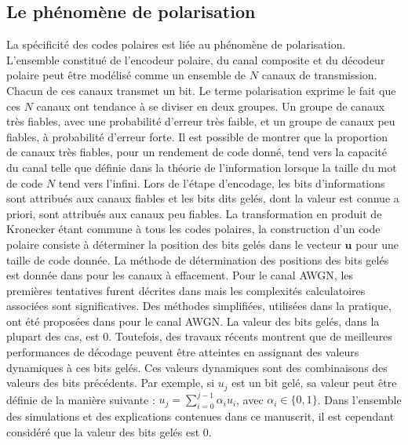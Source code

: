 \subsection{Le phénomène de polarisation}
\label{subsec:polarisation}
La spécificité des codes polaires est liée au phénomène de polarisation. L'ensemble constitué de l'encodeur polaire, du canal composite et du décodeur polaire peut être modélisé comme un ensemble de $N$ canaux de transmission. Chacun de ces canaux transmet un bit. Le terme \og polarisation \fg exprime le fait que ces $N$ canaux ont tendance à se diviser en deux groupes. Un groupe de canaux très fiables, avec une probabilité d'erreur très faible, et un groupe de canaux peu fiables, à probabilité d'erreur forte.
Il est possible de montrer que la proportion de canaux très fiables, pour un rendement de code donné, tend vers la capacité du canal telle que définie dans la théorie de l'information \cite{shannon_mathematical_2001} lorsque la taille du mot de code $N$ tend vers l'infini.
Lors de l'étape d'encodage, les bits d'informations sont attribués aux canaux fiables et les bits dits gelés, dont la valeur est connue a priori, sont attribués aux canaux peu fiables. La transformation en produit de Kronecker étant commune à tous les codes polaires, la construction d'un code polaire consiste à déterminer la position des bits gelés dans le vecteur $\mathbold{u}$ pour une taille de code donnée. La méthode de détermination des positions des bits gelés est donnée dans \cite{arikan_channel_2009} pour les canaux à effacement. Pour le canal AWGN, les premières tentatives furent décrites dans \cite{mori_performance_2009,mori_properties_2010} mais les complexités calculatoires associées sont significatives. Des méthodes simplifiées, utilisées dans la pratique, ont été proposées dans \cite{tal_how_2013,trifonov_efficient_2012,trifonov_randomized_2018} pour le canal AWGN. La valeur des bits gelés, dans la plupart des cas, est 0. Toutefois, des travaux récents \cite{trifonov_polar_2016,trifonov_randomized_2017} montrent que de meilleures performances de décodage peuvent être atteintes en assignant des valeurs dynamiques à ces bits gelés. Ces valeurs dynamiques sont des combinaisons des valeurs des bits précédents. Par exemple, si $u_j$ est un bit gelé, sa valeur peut être définie de la manière suivante : $u_j=\sum^{j-1}_{i=0} \alpha_i u_i$, avec $\alpha_i \in \{0,1\}$. Dans l'ensemble des simulations et des explications contenues dans ce manuscrit, il est cependant considéré que la valeur des bits gelés est 0.

